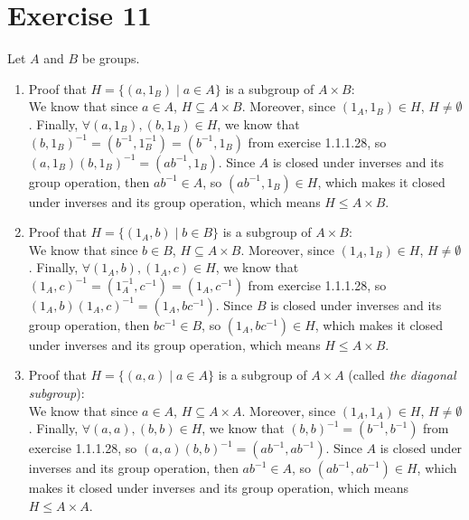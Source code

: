 \documentclass{article}
\begin{document}
    \section*{Exercise 11}
    Let $A$ and $B$ be groups. \\
    \begin{enumerate}[label=\textbf{\alph*.}]
        \item 
            Proof that $H = \{(a, 1_B) \mid a \in A\}$
            is a subgroup of $A \times B$: \\
            We know that since $a \in A$, $H \subseteq A \times B$.
            Moreover, since $(1_A, 1_B) \in H$, $H \neq \emptyset$.
            Finally, $\forall (a, 1_B), (b, 1_B) \in H$,
            we know that $(b, 1_B)^{-1} = (b^{-1}, 1_B^{-1})
            = (b^{-1}, 1_B)$ from exercise 1.1.1.28,
            so $(a, 1_B)(b, 1_B)^{-1} = (ab^{-1}, 1_B)$.
            Since $A$ is closed under inverses and its group operation,
            then $ab^{-1} \in A$,
            so $(ab^{-1}, 1_B) \in H$,
            which makes it closed under inverses and its group operation,
            which means $H \leqslant A \times B$.
        \item
            Proof that $H = \{(1_A, b) \mid b \in B\}$
            is a subgroup of $A \times B$: \\
            We know that since $b \in B$, $H \subseteq A \times B$.
            Moreover, since $(1_A, 1_B) \in H$, $H \neq \emptyset$.
            Finally, $\forall (1_A, b), (1_A, c) \in H$,
            we know that $(1_A, c)^{-1} = (1_A^{-1}, c^{-1})
            = (1_A, c^{-1})$ from exercise 1.1.1.28,
            so $ (1_A, b)(1_A, c)^{-1} = (1_A, bc^{-1})$.
            Since $B$ is closed under inverses and its group operation,
            then $bc^{-1} \in B$,
            so $(1_A, bc^{-1}) \in H$,
            which makes it closed under inverses and its group operation,
            which means $H \leqslant A \times B$.
        \item
            Proof that $H = \{(a, a) \mid a \in A\}$
            is a subgroup of $A \times A$
            (called \textit{the diagonal subgroup}): \\
            We know that since $a \in A$, $H \subseteq A \times A$.
            Moreover, since $(1_A, 1_A) \in H$, $H \neq \emptyset$.
            Finally, $\forall (a, a), (b, b) \in H$,
            we know that $(b, b)^{-1} = (b^{-1}, b^{-1})$
            from exercise 1.1.1.28,
            so $(a, a)(b, b)^{-1} = (ab^{-1}, ab^{-1})$.
            Since $A$ is closed under inverses and its group operation,
            then $ab^{-1} \in A$,
            so $(ab^{-1}, ab^{-1}) \in H$,
            which makes it closed under inverses and its group operation,
            which means $H \leqslant A \times A$.
    \end{enumerate}
\end{document}
